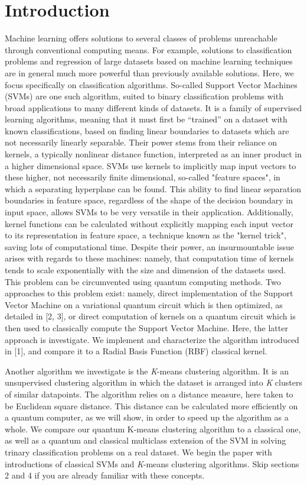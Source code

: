 \documentclass[twocolumn, english]{revtex4-2}
\numberwithin{equation}{section}
\begin{document}
\section{Introduction}
Machine learning offers solutions to several classes of problems unreachable through conventional computing means. For example, solutions to classification problems and regression of large datasets based on machine learning techniques are in general much more powerful than previously available solutions. Here, we focus specifically on classification algorithms. So-called Support Vector Machines (SVMs) are one such algorithm, suited to binary classification problems with broad applications to many different kinds of datasets. It is a family of supervised learning algorithms, meaning that it must first be “trained” on a dataset with known classifications, based on finding linear boundaries to datasets which are not necessarily linearly separable. Their power stems from their reliance on kernels, a typically nonlinear distance function, interpreted as an inner product in a higher dimensional space. SVMs use kernels to implicitly map input vectors to these higher, not necessarily finite dimensional, so-called "feature spaces", in which a separating hyperplane can be found. This ability to find linear separation boundaries in feature space, regardless of the shape of the decision boundary in input space, allows SVMs to be very versatile in their application. Additionally, kernel functions can be calculated without explicitly mapping each input vector to its representation in feature space, a technique known as the "kernel trick", saving lots of computational time. Despite their power, an insurmountable issue arises with regards to these machines: namely, that computation time of kernels tends to scale exponentially with the size and dimension of the datasets used. This problem can be circumvented using quantum computing methods. Two approaches to this problem exist: namely, direct implementation of the Support Vector Machine on a variational quantum circuit which is then optimized, as detailed in [2, 3], or direct computation of kernels on a quantum circuit which is then used to classically compute the Support Vector Machine. Here, the latter approach is investigate. We implement and characterize the algorithm introduced in [1], and compare it to a Radial Basis Function (RBF) classical kernel. 

Another algorithm we investigate is the \textit{K}-means clustering algorithm. It is an unsupervised clustering algorithm in which the dataset is arranged into \textit{K} clusters of similar datapoints. The algorithm relies on a distance measure, here taken to be Euclidean square distance. This distance can be calculated more efficiently on a quantum computer, as we will show, in order to speed up the algorithm as a whole. We compare our quantum K-means clustering algorithm to a classical one, as well as a quantum and classical multiclass extension of the SVM in solving trinary classification problems on a real dataset. We begin the paper with introductions of classical SVMs and \textit{K}-means clustering algorithms. Skip sections 2 and 4 if you are already familiar with these concepts.
\end{document}
